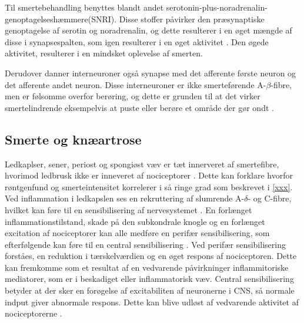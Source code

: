 Til smertebehandling benyttes blandt andet serotonin-plus-noradrenalin-genoptagelseshæmmere(SNRI). Disse stoffer påvirker den præsynaptiske genoptagelse af serotin og noradrenalin, og dette resulterer i en øget mængde af disse i synapsespalten, som igen resulterer i en øget aktivitet \citep{smerter}. Den øgede aktivitet, resulterer i en mindsket oplevelse af smerten. 

Derudover danner interneuroner også synapse med det afferente første neuron og det afferente andet neuron. Disse interneuroner er ikke smerteførende A-$\beta$-fibre, men er følsomme overfor berøring, og dette er grunden til at det virker smertelindrende eksempelvis at puste eller berøre et område der gør ondt \citep{cindys268}.

\subsection{Smerte og knæartrose}
Ledkaplser, sener, periost og spongiøst væv er tæt innerveret af smertefibre, hvorimod ledbrusk ikke er inneveret af nociceptorer \citep{smerter}. Dette kan forklare hvorfor  røntgenfund og smerteintensitet korrelerer i så ringe grad som beskrevet i \ref{xxx}. \citep{Petersen2016}  \citep{smerter}
Ved inflammation i ledkapslen ses en rekruttering af slumrende A-$\delta$- og C-fibre, hvilket kan føre til en sensibilisering af nervesystemet \citep{smerter}. En forlænget inflammationstilstand, skade på den subkondrale knogle og en forlænget excitation af nociceptorer kan alle medføre en perifær sensibilisering, som efterfølgende kan føre til en central sensibilisering \citep{Petersen2016} .
Ved perifær sensibilisering forståes, en reduktion i tærskelværdien og en øget respons af nociceptoren. Dette kan fremkomme som et resultat af en vedvarende påvirkninger inflammitoriske mediatorer, som er i beskadiget eller inflammatorisk væv. 
Central sensibilisering betyder at der sker en forøgelse af excitabiliten af neuronerne i CNS, så normale indput giver abnormale respons. Dette kan blive udløst af vedvarende aktivitet af nociceptorerne \citep{nature}.\\

